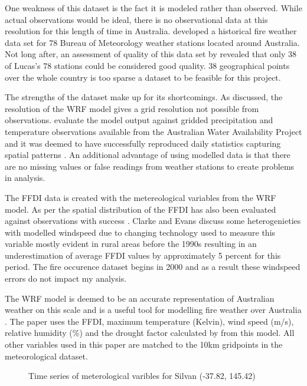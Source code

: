 \documentclass[11pt,a4paper]{article}
\begin{document}
One weakness of this dataset is the fact it is modeled rather than observed. While actual observations would be ideal, there is no observational data at this resolution for this length of time in Australia. \citet{lucas10} developed a historical fire weather data set for 78 Bureau of Meteorology weather stations located around Australia. Not long after, an assessment of quality of this data set by \citet{clarke2013} revealed that only 38 of Lucas's 78 stations could be considered good quality. 38 geographical points over the whole country is too sparse a dataset to be feasible for this project. 

The strengths of the dataset make up for its shortcomings. As discussed, the resolution of the WRF model gives a grid resolution not possible from observations. \citet{evans10} evaluate the model output against gridded precipitation and temperature observations available from the Australian Water Availability Project and it was deemed to have successfully reproduced daily statistics capturing spatial patterns  \citep{evans10, clarkeevans13}. An additional advantage of using modelled data is that there are no missing values or false readings from weather stations to create problems in analysis. 

The FFDI data is created with the metereological variables from the WRF model. As per \citet{clarkeevans13} the spatial distribution of the FFDI has also been evaluated against observations with success  \citep{sanabria13}. Clarke and Evans discuss some heterogenieties with modelled windspeed due to changing technology used to measure this variable mostly evident in rural areas before the 1990s resulting in an underestimation of average FFDI values by approximately 5 percent for this period. The fire occurence dataset begins in 2000 and as a result these windspeed errors do not impact my analysis.

The WRF model \citep{evans10} is deemed to be an accurate representation of Australian weather on this scale and is a useful tool for modelling fire weather over Australia \citep{clarke2013}. The paper uses the FFDI, maximum temperature (Kelvin), wind speed (m/s), relative humidity (\%) and the drought factor calculated by \citet{clarke2013}  from this model. All other variables used in this paper are matched to the 10km gridpoints in the meteorological dataset. 

\begin{figure}[h]
	\centering 
	\caption{Time series of meterological varibles for Silvan (-37.82, 145.42)} 
	\label{fig:silv} 
\end{figure}
\end{document}
